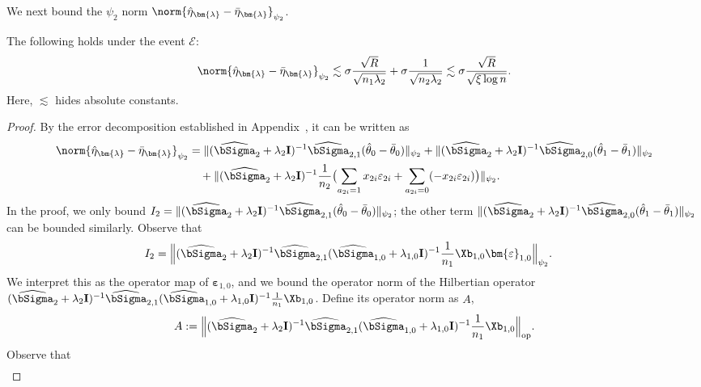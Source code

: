 \documentclass[12pt,a4paper,pdftex,onepage]{article}
\newcommand{\Sighat}{\widehat{{\bSigma}}}
\newcommand{\op}{\operatorname{op}}
\newcommand{\event}{\mathscr{E}}
\begin{document}
We next bound the \(\psi_2\) norm $\norm{\hat{\eta}_{\bm{\lambda}}-\bar{\eta}_{\bm{\lambda}}}_{\psi_2}$.

\begin{lemma}\label{lemma; variance psi2 bound}
The following holds under the event $\event$:
\begin{align*}
\norm{\hat{\eta}_{\bm{\lambda}}-\bar{\eta}_{\bm{\lambda}}}_{\psi_2} \lesssim \sigma\frac{ \sqrt{R}}{\sqrt{n_1 \lambda_2}} + \sigma\frac{1}{\sqrt{n_2\lambda_2}} \lesssim \sigma \frac{\sqrt{R}}{ \sqrt{\xi \log n}}.
\end{align*}   
Here, \(\lesssim\) hides absolute constants.
\end{lemma}

\begin{proof}
By the error decomposition established in Appendix~, it can be written as
\begin{align*}
\norm{ \hat{\eta}_{\bm{\lambda}} -\bar{\eta}_{\bm{\lambda}} }_{\psi_2} &= \|  (\Sighat_2 + \lambda_2 \mathbf{I})^{-1} \Sighat_{2,1}(\hat{\theta}_0 -\bar{\theta}_0) \|_{\psi_2} + \| (\Sighat_2 + \lambda_2 \mathbf{I})^{-1} \Sighat_{2,0}(\hat{\theta}_1 -\bar{\theta}_1) \|_{\psi_2} \\
&\quad+ \| (\Sighat_2 + \lambda_2 \mathbf{I})^{-1} \frac{1}{n_2}\bigl(  \sum_{a_{2i}=1}x_{2i}\varepsilon_{2i}+\sum_{a_{2i}=0} (- x_{2i}\varepsilon_{2i}) \bigr) \|_{\psi_2}.
\end{align*}
In the proof, we only bound $I_2 = \|  (\Sighat_2 + \lambda_2 \mathbf{I})^{-1} \Sighat_{2,1}(\hat{\theta}_0 -\bar{\theta}_0) \|_{\psi_2}$; the other term $\| (\Sighat_2 + \lambda_2 \mathbf{I})^{-1} \Sighat_{2,0}(\hat{\theta}_1 -\bar{\theta}_1) \|_{\psi_2}$ can be bounded similarly.
Observe that 
\begin{align*}
I_2&= \Bigl\|   (\Sighat_2 + \lambda_2 \mathbf{I})^{-1}  \Sighat_{2,1} (\Sighat_{1,0}+\lambda_{1,0} \mathbf{I})
^{-1} \frac{1}{n_1} \Xb_{1,0} \bm{\varepsilon}_{1,0}\Bigr\|_{\psi_2}.   
\end{align*}
We interpret this as the operator map of $\bm{\varepsilon}_{1,0}$, and we bound the operator norm of the Hilbertian operator $(\Sighat_2 + \lambda_2 \mathbf{I})^{-1}  \Sighat_{2,1} (\Sighat_{1,0}+\lambda_{1,0} \mathbf{I})^{-1} \frac{1}{n_1} \Xb_{1,0}$. 
Define its operator norm as $A$, 
\[
A := \Bigl\|(\Sighat_2 + \lambda_2 \mathbf{I})^{-1}  \Sighat_{2,1} (\Sighat_{1,0}+\lambda_{1,0} \mathbf{I})^{-1} \frac{1}{n_1} \Xb_{1,0}\Bigr\|_{\op}.
\]
Observe that 
\begin{align*}

\end{align*}
\end{proof}
\end{document}
